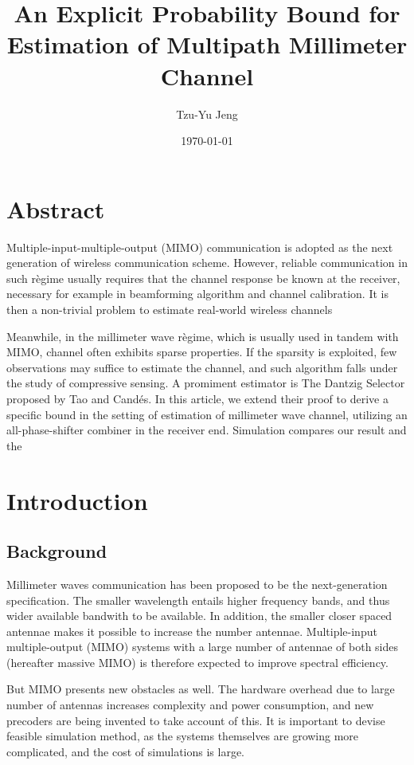 \documentclass[12pt]{article}
\author{Tzu-Yu Jeng}
\date{\today}
\title{An Explicit Probability Bound for Estimation of Multipath Millimeter Channel}
\begin{document}
\maketitle

\section{Abstract}


Multiple-input-multiple-output (MIMO) communication is adopted as the next generation of wireless communication scheme.
However, reliable communication in such r\`egime usually requires that the channel response be known at the receiver, necessary for example in beamforming algorithm and channel calibration.
It is then a non-trivial problem to estimate real-world wireless channels 

Meanwhile, in the millimeter wave r\`egime, which is usually used in tandem with MIMO, channel often exhibits sparse properties.
If the sparsity is exploited, few observations may suffice to estimate the channel, and such algorithm falls under the study of compressive sensing.
A promiment estimator is The Dantzig Selector proposed by Tao and Cand\'es.
In this article, we extend their proof to derive a specific bound in the setting of estimation of millimeter wave channel, utilizing an all-phase-shifter combiner in the receiver end.
Simulation compares our result and the 



\section{Introduction}

\subsection{Background}

Millimeter waves communication has been proposed to be the next-generation specification.
The smaller wavelength entails higher frequency bands, and thus wider available bandwith to be available.
In addition, the smaller closer spaced antennae makes it possible to increase the number antennae.
Multiple-input multiple-output (MIMO) systems with a large number of antennae of both sides (hereafter massive MIMO) is therefore expected to improve spectral efficiency.

But MIMO presents new obstacles as well.
The hardware overhead due to large number of antennas increases complexity and power consumption, and new precoders are being invented to take account of this.
It is important to devise feasible simulation method, as the systems themselves are growing more complicated, and the cost of simulations is large.
\end{document}

